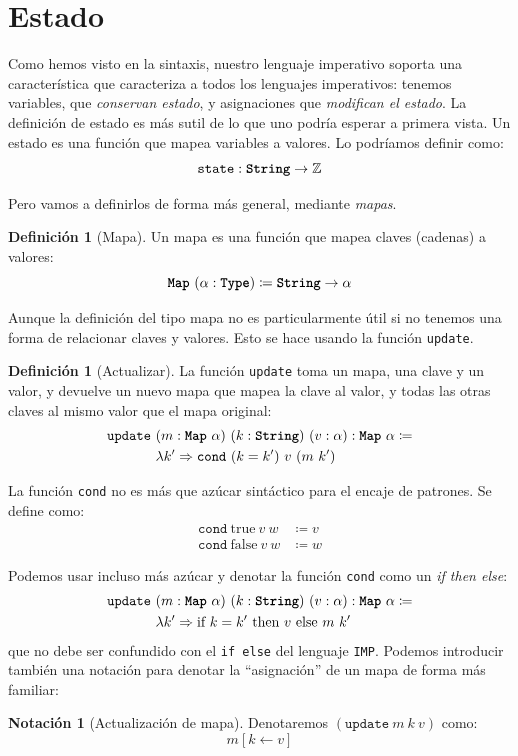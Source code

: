 \documentclass[
  a4paper, 
  10pt, 
  parskip=half, 
  toc=bibliography,
]{scrbook}
\theoremstyle{definition}
\theoremstyle{bolddef}
\newtheorem{definition}[theorem]{Definición}
\newtheorem{notation}[theorem]{Notación}
\newcommand{\funfont}[1]{\texttt{#1}}
\newcommand{\tyfont}[1]{\texttt{\textbf{#1}}}
\renewcommand{\mapsto}{\Rightarrow}
\newcommand{\LeanIfElse}[3]{\text{if} \ {#1} \ \text{then} \ {#2} \ \text{else} \ {#3}}
\newcommand{\LeanTrue}{\text{true}}
\newcommand{\LeanFalse}{\text{false}}
\newcommand{\ImpName}{\texttt{IMP}}
\begin{document}
\section{Estado}

Como hemos visto en la sintaxis, nuestro lenguaje imperativo soporta una
característica que caracteriza a todos los lenguajes imperativos: 
tenemos variables, que \emph{conservan estado}, y asignaciones que \emph{modifican el estado}.
La definición de estado es más sutil de lo que uno podría esperar a primera
vista. Un estado es una función que mapea variables a valores. Lo podríamos
definir como:
\[
\funfont{state} : \tyfont{String} \to \mathbb{Z}
\]

Pero vamos a definirlos de forma más general, mediante \emph{mapas}.
\begin{definition}[Mapa]
  Un mapa es una función que mapea claves (cadenas) a valores:
  \[
  \tyfont{Map} \ (\alpha : \tyfont{Type}) \coloneqq \tyfont{String} \to \alpha
  \]
\end{definition}

Aunque la definición del tipo mapa no es particularmente útil si no tenemos una forma de
relacionar claves y valores. Esto se hace usando la función \funfont{update}.
\begin{definition}[Actualizar]
  La función \funfont{update} toma un mapa, una clave y un valor, y devuelve 
  un nuevo mapa que mapea la clave al valor, y todas las otras claves al mismo
  valor que el mapa original:
  \begin{align*}
  \funfont{update} \ & (m: \tyfont{Map} \ \alpha) \ (k: \tyfont{String}) \ (v: \alpha): \tyfont{Map} \ \alpha \coloneqq \\
                      &\lambda k' \mapsto \funfont{cond} \ (k = k') \ v \ (m \ k')
  \end{align*}
\end{definition}

La función \funfont{cond} no es más que azúcar sintáctico para el encaje de
patrones. Se define como:
\begin{align*}
  \funfont{cond} \ \LeanTrue \ v \ w &\coloneqq v \\
  \funfont{cond} \ \LeanFalse \ v \ w &\coloneqq w
\end{align*}

Podemos usar incluso más azúcar y denotar la función \funfont{cond} como un \emph{if then else}:
\begin{align*}
  \funfont{update} \ & (m: \tyfont{Map} \ \alpha) \ (k: \tyfont{String}) \ (v: \alpha): \tyfont{Map} \ \alpha \coloneqq \\
                      &\lambda k' \mapsto \LeanIfElse{k = k'}{v}{m \ k'}
\end{align*}
que no debe ser confundido con el \texttt{if else} del lenguaje \ImpName.
Podemos introducir también una notación para denotar la \enquote{asignación} de un mapa de
forma más familiar:
\begin{notation}[Actualización de mapa]
  Denotaremos \((\funfont{update} \ m \ k \ v)\) como:
  \[m[k \leftarrow v]\]
\end{notation}
\end{document}
